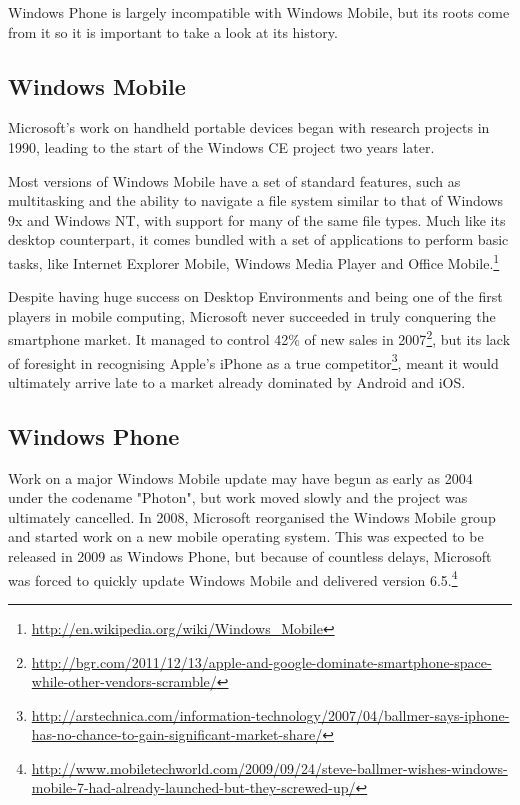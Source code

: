 Windows Phone is largely incompatible with Windows Mobile, but its roots come from it so it is important to take a look at its history.
\subsection{Windows Mobile}
Microsoft's work on handheld portable devices began with research projects in 1990, leading to the start of the Windows CE project two years later.

Most versions of Windows Mobile have a set of standard features, such as multitasking and the ability to navigate a file system similar to that of Windows 9x and Windows NT, with support for many of the same file types. Much like its desktop counterpart, it comes bundled with a set of applications to perform basic tasks, like Internet Explorer Mobile, Windows Media Player and Office Mobile.\footnote{\url{http://en.wikipedia.org/wiki/Windows_Mobile}}

Despite having huge success on Desktop Environments and being one of the first players in mobile computing, Microsoft never succeeded in truly conquering the smartphone market. It managed to control 42\% of new sales in 2007\footnote{\url{http://bgr.com/2011/12/13/apple-and-google-dominate-smartphone-space-while-other-vendors-scramble/}}, but its lack of foresight in recognising Apple's iPhone as a true competitor\footnote{\url{http://arstechnica.com/information-technology/2007/04/ballmer-says-iphone-has-no-chance-to-gain-significant-market-share/}}, meant it would ultimately arrive late to a market already dominated by Android and iOS.


\subsection{Windows Phone}
Work on a major Windows Mobile update may have begun as early as 2004 under the codename "Photon", but work moved slowly and the project was ultimately cancelled. In 2008, Microsoft reorganised the Windows Mobile group and started work on a new mobile operating system. This was expected to be released in 2009 as Windows Phone, but because of countless delays, Microsoft was forced to quickly update Windows Mobile and delivered version 6.5.\footnote{\url{http://www.mobiletechworld.com/2009/09/24/steve-ballmer-wishes-windows-mobile-7-had-already-launched-but-they-screwed-up/}} 

